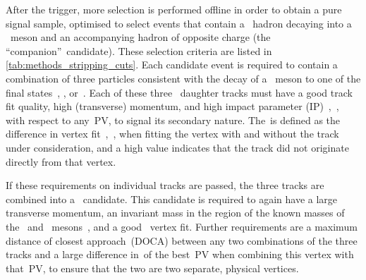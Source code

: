 After the trigger, more selection is performed offline in order to obtain a pure signal sample, optimised to select events that contain a \bquark~hadron decaying into a \DorDsmp~meson and an accompanying hadron of opposite charge (the ``companion''~candidate).
These selection criteria are listed in \cref{tab:methods_stripping_cuts}.
Each candidate event is required to contain a combination of three particles consistent with the decay of a \DorDsmp~meson to one of the final states~\KmpKPi, \KmpPiPi, or~\PimpPiPi.
Each of these three \DorDsmp~daughter tracks must have a good track fit quality, high (transverse) momentum, and high impact parameter (IP)~\chisq,~\chisqip, with respect to any~PV, to signal its secondary nature.
The~\chisqip is defined as the difference in vertex fit~\chisq,~\chisqvtx, when fitting the vertex with and without the track under consideration, and a high value indicates that the track did not originate directly from that vertex.

If these requirements on individual tracks are passed, the three tracks are combined into a \DorDsmp~candidate.
This candidate is required to again have a large transverse momentum, an invariant mass in the region of the known masses of the \Dmp~and \Dsmp~mesons~\cite{PDG}, and a good \Dsmp~vertex fit.
Further requirements are a maximum distance of closest approach~(DOCA) between any two combinations of the three tracks and a large difference in~\chisqvtx of the best~PV when combining this vertex with that~PV, to ensure that the two are two separate, physical vertices.

